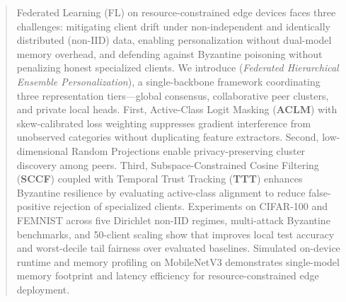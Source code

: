 \begin{abstract}
Federated Learning (FL) on resource-constrained edge devices faces three challenges: mitigating client drift under non-independent and identically distributed (non-IID) data, enabling personalization without dual-model memory overhead, and defending against Byzantine poisoning without penalizing honest specialized clients. We introduce \textbf{\fedhep{}} (\textit{Federated Hierarchical Ensemble Personalization}), a single-backbone framework coordinating three representation tiers---global consensus, collaborative peer clusters, and private local heads. First, Active-Class Logit Masking (\textbf{ACLM}) with skew-calibrated loss weighting suppresses gradient interference from unobserved categories without duplicating feature extractors. Second, low-dimensional Random Projections enable privacy-preserving cluster discovery among peers. Third, Subspace-Constrained Cosine Filtering (\textbf{SCCF}) coupled with Temporal Trust Tracking (\textbf{TTT}) enhances Byzantine resilience by evaluating active-class alignment to reduce false-positive rejection of specialized clients. Experiments on CIFAR-100 and FEMNIST across five Dirichlet non-IID regimes, multi-attack Byzantine benchmarks, and 50-client scaling show that \fedhep{} improves local test accuracy and worst-decile tail fairness over evaluated baselines. Simulated on-device runtime and memory profiling on MobileNetV3 demonstrates single-model memory footprint and latency efficiency for resource-constrained edge deployment.
\end{abstract}

